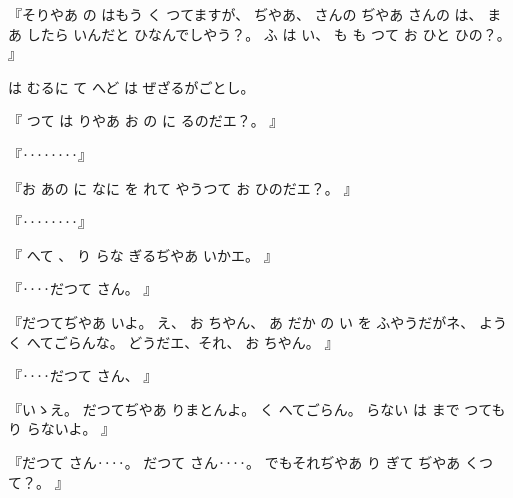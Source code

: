 %
『そりやあ
の
はもう
く
つてますが、
%
ぢやあ、
%
さんの
ぢやあ
さんの
は、
%
まあ
したら
いんだと
ひなんでしやう？。
%
ふ
は
い、
%
も
も
つて
お
ひと
ひの？。
』

%
は
むるに
て
へど
は
ぜざるがごとし。

%
『
つて
は
りやあ
お
の
に
るのだエ？。
』

%
『‥‥‥‥』

%
『お
あの
に
なに
を
れて
やうつて
お
ひのだエ？。
』

%
『‥‥‥‥』

%
『
へて
、
%
り
らな
ぎるぢやあ
いかエ。
』

%
『‥‥だつて
さん。
』

%
『だつてぢやあ
いよ。
%
え、
%
お
ちやん、
%
あ
だか
の
い
を
ふやうだがネ、
%
ようく
へてごらんな。
%
どうだエ、それ、
%
お
ちやん。
』

%
『‥‥だつて
さん、
』

%
『いゝえ。
%
だつてぢやあ
りまとんよ。
%
く
へてごらん。
%
らない
は
まで
つても
り
らないよ。
』

%
『だつて
さん‥‥。
%
だつて
さん‥‥。
%
でもそれぢやあ
り
ぎて
ぢやあ
くつて？。
』
